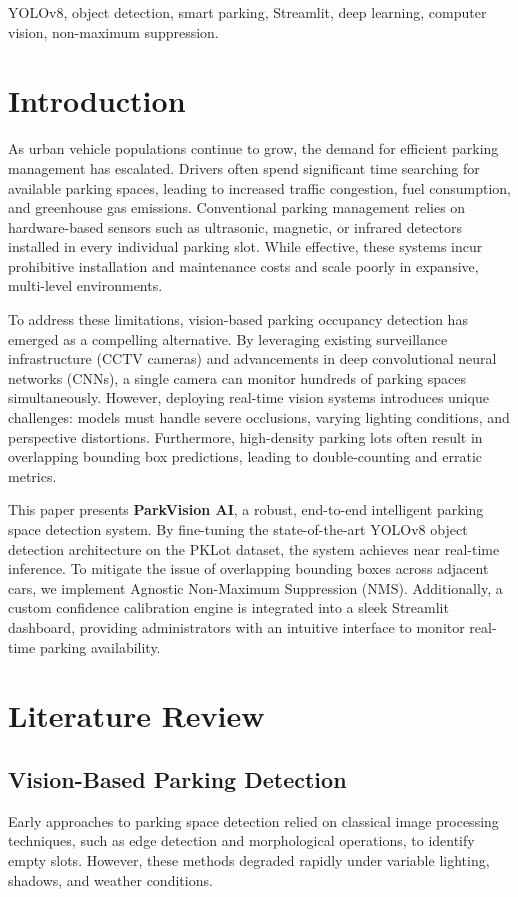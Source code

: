 \documentclass[conference]{IEEEtran}
\begin{document}
\begin{IEEEkeywords}
YOLOv8, object detection, smart parking, Streamlit, deep learning, computer vision, non-maximum suppression.
\end{IEEEkeywords}

\section{Introduction}
As urban vehicle populations continue to grow, the demand for efficient parking management has escalated. Drivers often spend significant time searching for available parking spaces, leading to increased traffic congestion, fuel consumption, and greenhouse gas emissions. Conventional parking management relies on hardware-based sensors such as ultrasonic, magnetic, or infrared detectors installed in every individual parking slot. While effective, these systems incur prohibitive installation and maintenance costs and scale poorly in expansive, multi-level environments.

To address these limitations, vision-based parking occupancy detection has emerged as a compelling alternative. By leveraging existing surveillance infrastructure (CCTV cameras) and advancements in deep convolutional neural networks (CNNs), a single camera can monitor hundreds of parking spaces simultaneously. However, deploying real-time vision systems introduces unique challenges: models must handle severe occlusions, varying lighting conditions, and perspective distortions. Furthermore, high-density parking lots often result in overlapping bounding box predictions, leading to double-counting and erratic metrics.

This paper presents \textbf{ParkVision AI}, a robust, end-to-end intelligent parking space detection system. By fine-tuning the state-of-the-art YOLOv8 object detection architecture on the PKLot dataset, the system achieves near real-time inference. To mitigate the issue of overlapping bounding boxes across adjacent cars, we implement Agnostic Non-Maximum Suppression (NMS). Additionally, a custom confidence calibration engine is integrated into a sleek Streamlit dashboard, providing administrators with an intuitive interface to monitor real-time parking availability.

\section{Literature Review}
\subsection{Vision-Based Parking Detection}
Early approaches to parking space detection relied on classical image processing techniques, such as edge detection and morphological operations, to identify empty slots. However, these methods degraded rapidly under variable lighting, shadows, and weather conditions. 
\end{document}
